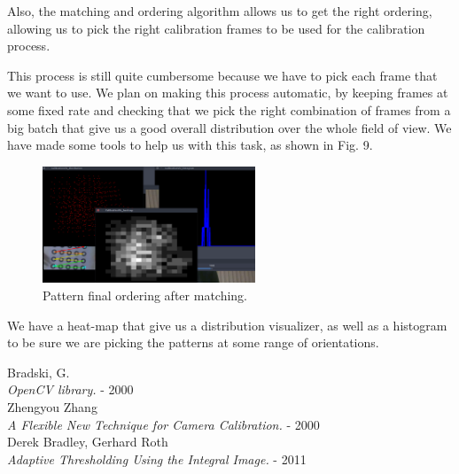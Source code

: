\documentclass[journal]{IEEEtran}
\begin{document}
Also, the matching and ordering algorithm allows us to get the right ordering, allowing us to pick the right calibration frames to be used for the calibration process.

This process is still quite cumbersome because we have to pick each frame that we want to use. We plan on making this process automatic, by keeping frames at some fixed rate and checking that we pick the right combination of frames from a big batch that give us a good overall distribution over the whole field of view. We have made some tools to help us with this task, as shown in Fig. 9.

\begin{figure}[H]
\centering
\includegraphics[width=2.5in]{_img/tools.png}
\caption{Pattern final ordering after matching.}
\end{figure}

We have a heat-map that give us a distribution visualizer, as well as a histogram to be sure we are picking the patterns at some range of orientations. 


\begin{thebibliography}{1}

  Bradski, G. \\
  \textit{OpenCV library.} - 2000
\\
  Zhengyou Zhang \\
  \textit{A Flexible New Technique for Camera Calibration.} - 2000
\\
  Derek Bradley, Gerhard Roth \\
  \textit{Adaptive Thresholding Using the Integral Image.} - 2011

\end{thebibliography}
\end{document}
